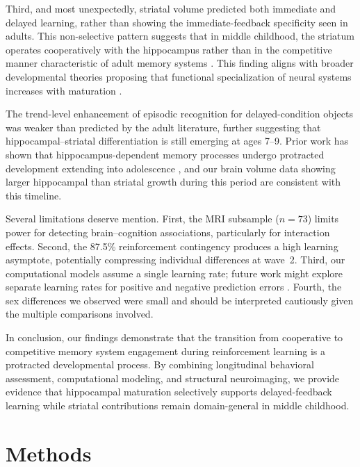 \documentclass[11pt]{article}
\begin{document}
Third, and most unexpectedly, striatal volume predicted both immediate and delayed learning, rather than showing the immediate-feedback specificity seen in adults. This non-selective pattern suggests that in middle childhood, the striatum operates cooperatively with the hippocampus rather than in the competitive manner characteristic of adult memory systems \citep{poldrack2001interactive}. This finding aligns with broader developmental theories proposing that functional specialization of neural systems increases with maturation \citep{nussenbaum2019reinforcement}.

The trend-level enhancement of episodic recognition for delayed-condition objects was weaker than predicted by the adult literature, further suggesting that hippocampal--striatal differentiation is still emerging at ages 7--9. Prior work has shown that hippocampus-dependent memory processes undergo protracted development extending into adolescence \citep{ghetti2016development}, and our brain volume data showing larger hippocampal than striatal growth during this period are consistent with this timeline.

Several limitations deserve mention. First, the MRI subsample ($n = 73$) limits power for detecting brain--cognition associations, particularly for interaction effects. Second, the 87.5\% reinforcement contingency produces a high learning asymptote, potentially compressing individual differences at wave~2. Third, our computational models assume a single learning rate; future work might explore separate learning rates for positive and negative prediction errors \citep{frank2004carrot}. Fourth, the sex differences we observed were small and should be interpreted cautiously given the multiple comparisons involved.

In conclusion, our findings demonstrate that the transition from cooperative to competitive memory system engagement during reinforcement learning is a protracted developmental process. By combining longitudinal behavioral assessment, computational modeling, and structural neuroimaging, we provide evidence that hippocampal maturation selectively supports delayed-feedback learning while striatal contributions remain domain-general in middle childhood.

\section{Methods}
\end{document}

